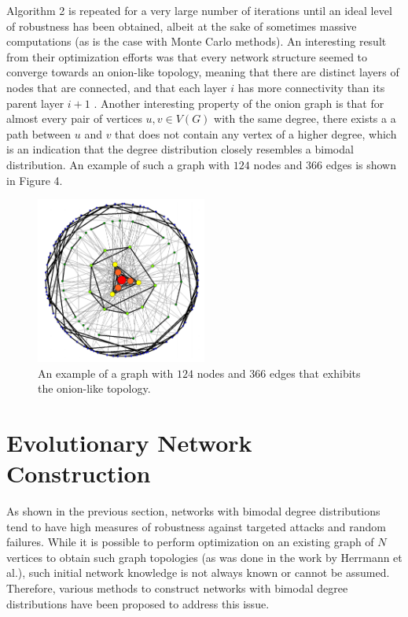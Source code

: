 \documentclass[doc]{apa}%
\begin{document}
Algorithm 2 is repeated for a very large number of iterations until an ideal level of robustness has been obtained, albeit at the sake of sometimes massive computations (as is the case with Monte Carlo methods).
An interesting result from their optimization efforts was that every network structure seemed to converge towards an onion-like topology, meaning that there are distinct layers of nodes that are connected, and that each layer $i$ has more connectivity than its parent layer $i+1$ \cite{Onion}. Another interesting property of the onion graph is that for almost every pair of vertices $u, v \in V(G)$ with the same degree, there exists a a path between $u$ and $v$ that does not contain any vertex of a higher degree, which is an indication that the degree distribution closely resembles a bimodal distribution. An example of such a graph with $124$ nodes and $366$ edges is shown in Figure 4.

\begin{figure}[h!]
	\label{fig:Onion}
	\centering
		\includegraphics[width=0.5\textwidth]{Onion.jpg}
	\caption{An example of a graph with $124$ nodes and $366$ edges that exhibits the onion-like topology.} %
\end{figure}


\section{Evolutionary Network Construction}

As shown in the previous section, networks with bimodal degree distributions tend to have high measures of robustness against targeted attacks and random failures. While it is possible to perform optimization on an existing graph of $N$ vertices to obtain such graph topologies (as was done in the work by Herrmann et al.), such initial network knowledge is not always known or cannot be assumed. Therefore, various methods to construct networks with bimodal degree distributions have been proposed to address this issue. 
\end{document}
